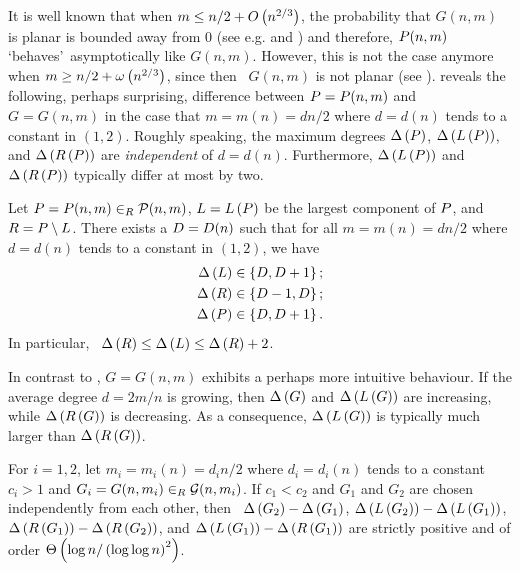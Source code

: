 It is well known that when $m\leq n/2+O\left(n^{2/3}\right)$, the probability that $G(n,m)$ is planar is bounded away from 0 (see e.g.  and \cite{JansonKnuthLuczakPittel1993,LuczakPittelWierman1994,NoyRavelomananaRue2015}) and therefore, $P(n,m)$ \lq behaves\rq\ asymptotically like $G(n,m)$. However, this is not the case anymore when $m\geq n/2+\omega\left(n^{2/3}\right)$, since then \whp\ $G(n,m)$ is not planar (see \cite{LuczakPittelWierman1994,NoyRavelomananaRue2015}).  reveals the following, perhaps surprising, difference between $P=P(n,m)$ and $G=G(n,m)$ in the case that $m=m(n)=d n/2$ where $d=d(n)$ tends to a constant in $\left(1,2\right)$. Roughly speaking, the maximum degrees $\Delta\left(P\right)$, $\Delta\left(L\left(P\right)\right)$, and $\Delta\left(R\left(P\right)\right)$ are {\em independent} of $d=d(n)$. Furthermore, $\Delta\left(L\left(P\right)\right)$ and $\Delta\left(R\left(P\right)\right)$ typically differ at most by two.

\begin{coro}\label{MDcor:independent}
Let $P=P(n,m)\in_R \mathcal{P}(n,m)$, $L=L\left(P\right)$ be the largest component of $P$, and $R=P\setminus L$. There exists a $D=D(n)$ such that for all $m=m(n)=d n/2$ where $d=d(n)$ tends to a constant in $\left(1,2\right)$, we have \whp\ 
\begin{align*}
\Delta\left(L\right)&\in \left\{D, D+1\right\};\\
\Delta\left(R\right)&\in \left\{D-1, D\right\};\\
\Delta\left(P\right)&\in \left\{D, D+1\right\}.
\end{align*}
In particular, \whp\ $\Delta\left(R\right)\leq\Delta\left(L\right)\leq \Delta\left(R\right)+2$.
\end{coro}

In contrast to , $G=G(n,m)$ exhibits a perhaps more intuitive behaviour. If the average degree $d=2m/n$ is growing, then $\Delta\left(G\right)$ and $\Delta\left(L\left(G\right)\right)$ are increasing, while $\Delta\left(R\left(G\right)\right)$ is decreasing. As a consequence, $\Delta\left(L\left(G\right)\right)$ is typically much larger than $\Delta\left(R\left(G\right)\right)$. 

\begin{prop}\label{MDpro:ER}
For $i=1,2$, let $m_i=m_i(n)=d_i n/2$ where $d_i=d_i(n)$ tends to a constant $c_i>1$ and $G_i=G(n,m_i)\in_R \mathcal G(n,m_i)$. If $c_1<c_2$ and $G_1$ and $G_2$ are chosen independently from each other, then \whp\ $\Delta\left(G_2\right)-\Delta\left(G_1\right)$, $\Delta\left(L\left(G_2\right)\right)-\Delta\left(L\left(G_1\right)\right)$, 	$\Delta\left(R\left(G_1\right)\right)-\Delta\left(R\left(G_2\right)\right)$, and $\Delta\left(L\left(G_1\right)\right)-\Delta\left(R\left(G_1\right)\right)$ are strictly positive and of order $\Theta\left(\log n/\left(\log \log n\right)^2\right)$.
\end{prop}

